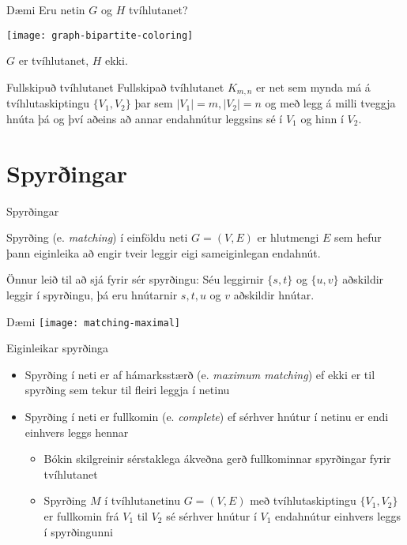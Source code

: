 \documentclass{beamer}
\begin{document}
\begin{frame}{Dæmi}
Eru netin $G$ og $H$ tvíhlutanet?

\begin{center}
\texttt{[image: graph-bipartite-coloring]}
\end{center}
\pause

$G$ er tvíhlutanet, $H$ ekki.
\end{frame}

\begin{frame}{Fullskipuð tvíhlutanet}
Fullskipað tvíhlutanet $K_{m, n}$ er net sem mynda má á tvíhlutaskiptingu $\{V_1, V_2\}$ þar sem $|V_1| =m, |V_2|=n$ og með legg á milli tveggja hnúta þá og því aðeins að annar endahnútur leggsins sé í $V_1$ og hinn í $V_2$.
\end{frame}

\section{Spyrðingar}

\begin{frame}{Spyrðingar}
\begin{tcolorbox}[title=Spyrðing]
Spyrðing (e. \emph{matching}) í einföldu neti $G = (V, E)$ er hlutmengi $E$ sem hefur þann eiginleika að engir tveir leggir eigi sameiginlegan endahnút.
\end{tcolorbox}
Önnur leið til að sjá fyrir sér spyrðingu: Séu leggirnir $\{s, t\}$ og $\{u, v\}$ aðskildir leggir í spyrðingu, þá eru hnútarnir $s, t, u$ og $v$ aðskildir hnútar.
\end{frame}

\begin{frame}{Dæmi}
\texttt{[image: matching-maximal]}
\end{frame}

\begin{frame}{Eiginleikar spyrðinga}
\begin{itemize}
 \item Spyrðing í neti er af hámarksstærð (e. \emph{maximum matching}) ef ekki er til spyrðing sem tekur til fleiri leggja í netinu
 \item Spyrðing í neti er fullkomin (e. \emph{complete}) ef sérhver hnútur í netinu er endi einhvers leggs hennar
 \begin{itemize}
  \item Bókin skilgreinir sérstaklega ákveðna gerð fullkominnar spyrðingar fyrir tvíhlutanet
  \item Spyrðing $M$ í tvíhlutanetinu $G=(V, E)$ með tvíhlutaskiptingu $\{V_1, V_2\}$ er fullkomin frá $V_1$ til $V_2$ sé sérhver hnútur í $V_1$ endahnútur einhvers leggs í spyrðingunni 
 \end{itemize}
\end{itemize}
\end{frame}
\end{document}
